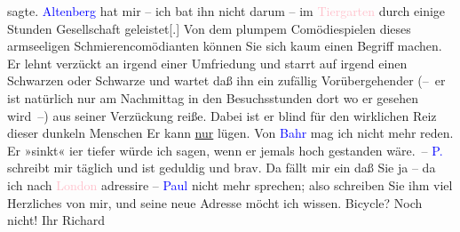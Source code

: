                     sagte.\pend
           \pstart
           \textcolor{blue}{Altenberg}{}\ledrightnote{\textcolor{blue}{Peter Altenberg}} hat mir – ich bat ihn nicht darum –
                        {\pb}im \textcolor{pink}{Tiergarten}{}\ledrightnote{\textcolor{pink}{Tiergarten Schönbrunn}} durch einige Stunden Gesellschaft geleistet{[}.{]}
                    Von dem plumpem Comödiespielen dieses armseeligen Schmierencomödianten können
                    Sie sich kaum einen Begriff machen. {\pb}Er lehnt verzückt an irgend
                    einer Umfriedung und starrt auf irgend einen Schwarzen oder Schwarze und wartet
                    daß ihn ein zufällig Vorübergehender (– er ist natürlich nur am Nachmittag
                    in den Besuchsstunden dort wo er gesehen wird –) {\pb}aus seiner Verzückung reiße.
                    Dabei ist er blind für den wirklichen Reiz dieser dunkeln Menschen\pend
           \pstart
           Er kann \uline{nur} lügen.\pend
           \pstart
           Von \textcolor{blue}{Bahr}{}\ledrightnote{\textcolor{blue}{Hermann Bahr}} mag ich {\pb}nicht mehr reden. Er »sinkt«
                    i{\geminationm}er tiefer würde ich sagen, wenn er jemals hoch gestanden wäre. –\pend
           \pstart
           \textcolor{blue}{P.}{}\ledrightnote{\textcolor{blue}{Paula Beer-Hofmann}}
                schreibt mir täglich und ist geduldig und
                    brav. Da fällt {\pb}mir ein daß
                    Sie ja – da ich nach \textcolor{pink}{London}{}\ledrightnote{\textcolor{pink}{London}} adressire – \textcolor{blue}{Paul}{}\ledrightnote{\textcolor{blue}{Paul Goldmann}} nicht mehr sprechen; also schreiben Sie
                    ihm viel Herzliches von mir, und seine neue Adresse möcht ich wissen. Bicycle?
                    Noch nicht!\pend
           \pstart Ihr \spacefill\mbox{Richard}\pend{}\endnumbering{}  
      